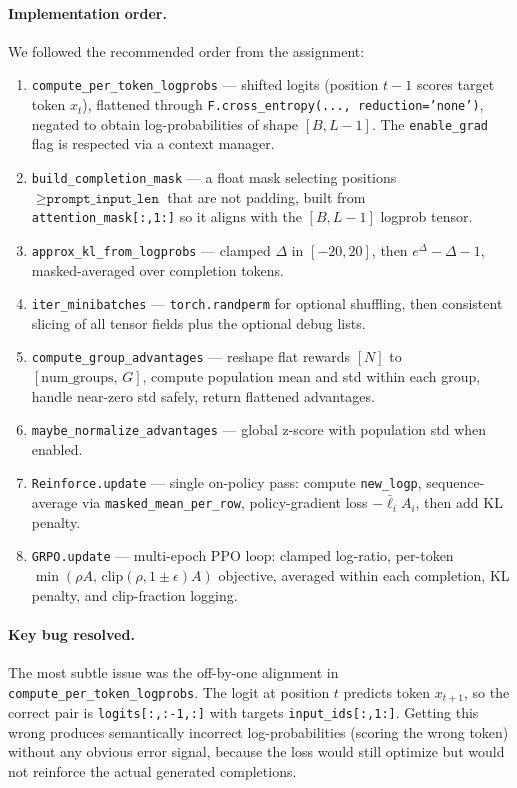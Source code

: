 \documentclass[11pt]{article}
\begin{document}
\paragraph{Implementation order.}
We followed the recommended order from the assignment:
\begin{enumerate}[leftmargin=1.5em]
  \item \texttt{compute\_per\_token\_logprobs} --- shifted logits (position $t{-}1$ scores
        target token $x_t$), flattened through \texttt{F.cross\_entropy(..., reduction='none')},
        negated to obtain log-probabilities of shape $[B, L{-}1]$.
        The \texttt{enable\_grad} flag is respected via a context manager.
  \item \texttt{build\_completion\_mask} --- a float mask selecting positions
        $\geq \texttt{prompt\_input\_len}$ that are not padding, built from
        \texttt{attention\_mask[:,1:]} so it aligns with the $[B, L{-}1]$ logprob tensor.
  \item \texttt{approx\_kl\_from\_logprobs} --- clamped $\Delta$ in $[-20, 20]$, then
        $e^\Delta - \Delta - 1$, masked-averaged over completion tokens.
  \item \texttt{iter\_minibatches} --- \texttt{torch.randperm} for optional shuffling,
        then consistent slicing of all tensor fields plus the optional debug lists.
  \item \texttt{compute\_group\_advantages} --- reshape flat rewards $[N]$ to
        $[\text{num\_groups},\, G]$, compute population mean and std within each group,
        handle near-zero std safely, return flattened advantages.
  \item \texttt{maybe\_normalize\_advantages} --- global z-score with population std when
        enabled.
  \item \texttt{Reinforce.update} --- single on-policy pass: compute \texttt{new\_logp},
        sequence-average via \texttt{masked\_mean\_per\_row}, policy-gradient loss
        $-\bar{\ell}_i A_i$, then add KL penalty.
  \item \texttt{GRPO.update} --- multi-epoch PPO loop: clamped log-ratio, per-token
        $\min(\rho A,\,\mathrm{clip}(\rho,1{\pm}\epsilon)A)$ objective, averaged within
        each completion, KL penalty, and clip-fraction logging.
\end{enumerate}

\paragraph{Key bug resolved.}
The most subtle issue was the off-by-one alignment in \texttt{compute\_per\_token\_logprobs}.
The logit at position $t$ predicts token $x_{t+1}$, so the correct pair is
\texttt{logits[:,:-1,:]} with targets \texttt{input\_ids[:,1:]}. Getting this wrong
produces semantically incorrect log-probabilities (scoring the wrong token) without any
obvious error signal, because the loss would still optimize but would not reinforce the
actual generated completions.
\end{document}
